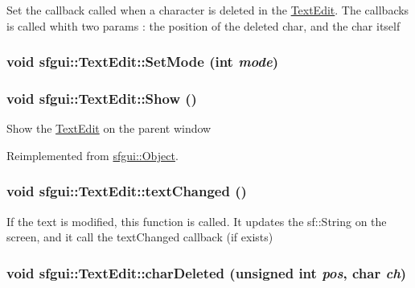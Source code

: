 Set the callback called when a character is deleted in the \hyperlink{classsfgui_1_1TextEdit}{TextEdit}. The callbacks is called whith two params : the position of the deleted char, and the char itself \hypertarget{classsfgui_1_1TextEdit_214a2f7f8dae54527ca354956ec4f06c}{
\subsubsection[SetMode]{\setlength{\rightskip}{0pt plus 5cm}void sfgui::TextEdit::SetMode (int {\em mode})}}
\label{classsfgui_1_1TextEdit_214a2f7f8dae54527ca354956ec4f06c}


\hypertarget{classsfgui_1_1TextEdit_1ee03247816213b34caaff365b160de0}{
\subsubsection[Show]{\setlength{\rightskip}{0pt plus 5cm}void sfgui::TextEdit::Show ()}}
\label{classsfgui_1_1TextEdit_1ee03247816213b34caaff365b160de0}




Show the \hyperlink{classsfgui_1_1TextEdit}{TextEdit} on the parent window 

Reimplemented from \hyperlink{classsfgui_1_1Object_cdf7f9b5f731e49e0e13e55de704805d}{sfgui::Object}.\hypertarget{classsfgui_1_1TextEdit_04bf790d96e0014479cc791691ecbade}{
\subsubsection[textChanged]{\setlength{\rightskip}{0pt plus 5cm}void sfgui::TextEdit::textChanged ()}}
\label{classsfgui_1_1TextEdit_04bf790d96e0014479cc791691ecbade}




If the text is modified, this function is called. It updates the sf::String on the screen, and it call the textChanged callback (if exists) \hypertarget{classsfgui_1_1TextEdit_8c3d822835999b2b0a38c1ef95eca4ff}{
\subsubsection[charDeleted]{\setlength{\rightskip}{0pt plus 5cm}void sfgui::TextEdit::charDeleted (unsigned int {\em pos}, \/  char {\em ch})}}
\label{classsfgui_1_1TextEdit_8c3d822835999b2b0a38c1ef95eca4ff}


